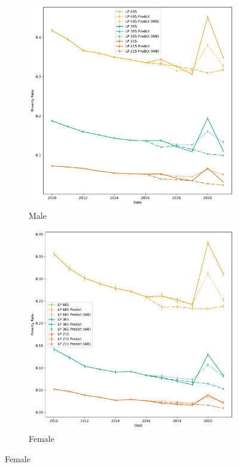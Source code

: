 \begin{figure}[H]
    \caption{Poverty Rate: by Sex of Household Head}
    \centering
         \centering
         \begin{subfigure}[b]{0.47\textwidth}
            \centering
            \includegraphics[width=\textwidth]{../figures/fig10a_poverty_rate_time_series_male.pdf}        
            \caption{Male}
         \end{subfigure}
         \hfill
         \begin{subfigure}[b]{0.47\textwidth}
            \centering
            \includegraphics[width=\textwidth]{../figures/fig10b_poverty_rate_time_series_female.pdf}        
            \caption{Female}
         \end{subfigure} 
\end{figure}



